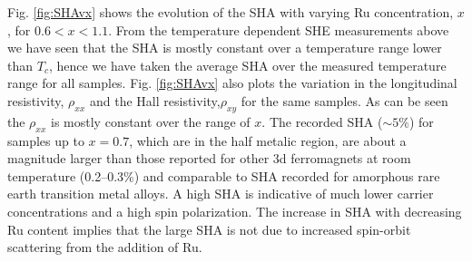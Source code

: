 \documentclass[reprint,aip,apl,floatfix,linenumbers,superscriptaddress]{revtex4-1}
\begin{document}
Fig. \ref{fig:SHAvx} shows the evolution of the SHA with varying Ru 
concentration, $x$, for $0.6<x<1.1$. From the temperature dependent SHE 
measurements above we have seen that the SHA is mostly constant over a 
temperature range lower than $T_c$, hence we have taken the average SHA over 
the measured temperature range for all samples.  Fig. \ref{fig:SHAvx} also 
plots the variation in the longitudinal resistivity, $\rho_{xx}$ and the Hall 
resistivity,$\rho_{xy}$ for the same samples. As can be seen the $\rho_{xx}$ 
is mostly constant over the range of $x$.  The recorded SHA ($\sim \num{5}\%$)
 for samples up to $x=0.7$, which are in the half metalic region, are about a 
magnitude larger than those reported for other 3d ferromagnets at room 
temperature (\numrange{0.2}{0.3}\%)\cite{dorleijn1976} and comparable to SHA 
recorded for amorphous rare earth transition metal alloys\cite{Kim2001}. A 
high SHA is indicative of much lower carrier concentrations and a high spin 
polarization. The increase in SHA with decreasing Ru content implies that the 
large SHA is not due to increased spin-orbit scattering from the addition of 
Ru. 
\end{document}
